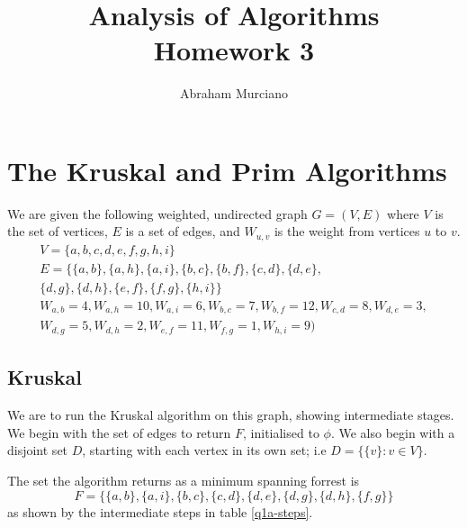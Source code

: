 \documentclass{article}
\title{Analysis of Algorithms \\
\medskip
\large Homework 3}
\author{Abraham Murciano}
\begin{document}
\maketitle

\section{The Kruskal and Prim Algorithms}

We are given the following weighted, undirected graph \(G = (V, E)\) where \(V\) is the set of vertices, \(E\) is a set of edges, and \(W_{u,v}\) is the weight from vertices \(u\) to \(v\).
\begin{gather*}
	V = \{a, b, c, d, e, f, g, h, i\} \\
	E = \{\{a, b\}, \{a, h\}, \{a, i\}, \{b, c\}, \{b, f\}, \{c, d\}, \{d, e\},\\ \{d, g\}, \{d, h\}, \{e, f\}, \{f, g\}, \{h, i\}\} \\
	W_{a, b} = 4, W_{a, h} = 10, W_{a, i} = 6, W_{b, c} = 7, W_{b, f} = 12, W_{c, d} = 8, W_{d, e} = 3, \\ W_{d, g} = 5, W_{d, h} = 2, W_{e, f} = 11, W_{f, g} = 1, W_{h, i} = 9)
\end{gather*}

\subsection{Kruskal}

We are to run the Kruskal algorithm on this graph, showing intermediate stages. We begin with the set of edges to return \(F\), initialised to \(\phi\). We also begin with a disjoint set \(D\), starting with each vertex in its own set; i.e \(D = \{\{v\} : v \in V\}\).

The set the algorithm returns as a minimum spanning forrest is
\begin{equation*}
	F = \{\{a, b\}, \{a, i\}, \{b, c\}, \{c, d\}, \{d, e\}, \{d, g\}, \{d, h\}, \{f, g\}\}
\end{equation*}
as shown by the intermediate steps in table \ref{q1a-steps}.
\end{document}

